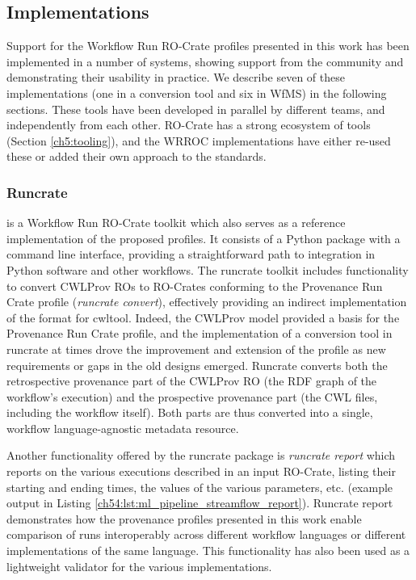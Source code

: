 \subsection{Implementations}\label{ch54:implementations}

Support for the Workflow Run RO-Crate profiles presented in this work has been implemented in a number of systems, showing support from the community and demonstrating their usability in practice.
We describe seven of these implementations (one in a conversion tool and six in WfMS) in the following sections.
These tools have been developed in parallel by different teams, and independently from each other. 
RO-Crate has a strong ecosystem of tools \cite{Soiland-Reyes 2022a} (Section \vref{ch5:tooling}), and the \acrshort{WRROC} implementations have either re-used these or added their own approach to the standards.


\subsubsection{Runcrate}\label{ch54:runcrate}

 \cite{Leo 2023a} is a Workflow Run RO-Crate toolkit which also serves as a reference implementation of the proposed profiles.
It consists of a Python package with a command line interface, providing a straightforward path to integration in Python software and other workflows.
The runcrate toolkit includes functionality to convert CWLProv ROs to RO-Crates conforming to the Provenance Run Crate profile (\emph{runcrate convert}), effectively providing an indirect implementation of the format for cwltool.
Indeed, the CWLProv model provided a basis for the Provenance Run Crate profile, and the implementation of a conversion tool in runcrate at times drove the improvement and extension of the profile as new requirements or gaps in the old designs emerged.
Runcrate converts both the retrospective provenance part of the CWLProv RO (the RDF graph of the workflow's execution) and the prospective provenance part (the CWL files, including the workflow itself).
Both parts are thus converted into a single, workflow language-agnostic metadata resource.

Another functionality offered by the runcrate package is \emph{runcrate report} which reports on the various executions described in an input RO-Crate, listing their starting and ending times, the values of the various parameters, etc. (example output in Listing \vref{ch54:lst:ml_pipeline_streamflow_report}).
Runcrate report demonstrates how the provenance profiles presented in this work enable comparison of runs interoperably across different workflow languages or different implementations of the same language.
This functionality has also been used as a lightweight validator for the various implementations.

